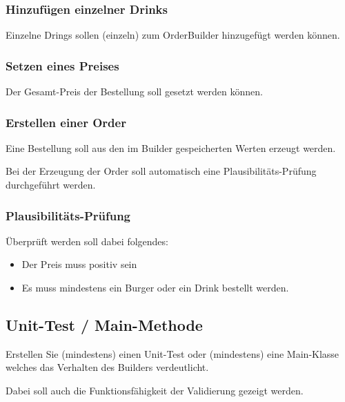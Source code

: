 \documentclass[oneside,a4paper]{scrartcl}
\begin{document}
\subsubsection{Hinzufügen einzelner Drinks}
Einzelne Drings sollen (einzeln) zum OrderBuilder hinzugefügt werden können.

\subsubsection{Setzen eines Preises}
Der Gesamt-Preis der Bestellung soll gesetzt werden können.

\subsubsection{Erstellen einer Order}
Eine Bestellung soll aus den im Builder gespeicherten Werten erzeugt werden. 

Bei der Erzeugung der Order soll automatisch eine Plausibilitäts-Prüfung durchgeführt werden.

\subsubsection{Plausibilitäts-Prüfung}
Überprüft werden soll dabei folgendes:

\begin{itemize}
  \item Der Preis muss positiv sein
  \item Es muss mindestens ein Burger oder ein Drink bestellt werden.
\end{itemize}



\subsection{Unit-Test / Main-Methode}
Erstellen Sie (mindestens) einen Unit-Test oder (mindestens) eine Main-Klasse welches das Verhalten des Builders verdeutlicht.

Dabei soll auch die Funktionsfähigkeit der Validierung gezeigt werden.
\end{document}
